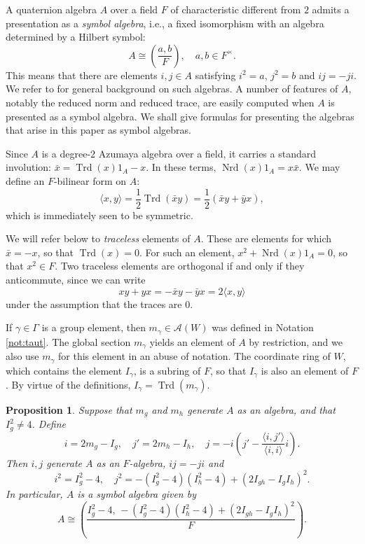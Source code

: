 \documentclass[reqno,oneside,dvipsnames,pdfnames,final]{amsart}
\newtheorem{prop}[thm]{Proposition}
\theoremstyle{definition}
\newcommand{\sh}[1]{\mathcal{#1}}
\newcommand{\iso}{\cong}
\newcommand{\Nrd}{\operatorname{Nrd}}
\newcommand{\Trd}{\operatorname{Trd}}
\begin{document}
A quaternion algebra $A$ over a field $F$ of characteristic different from $2$ admits a presentation as a \emph{symbol algebra}, i.e., a fixed isomorphism with an algebra determined by a Hilbert symbol:
\[ A \iso \left( \frac{a,b}{F} \right ),\quad a,b \in F^\times. \]
This means that there are elements $i, j \in A$ satisfying $i^2=a$, $j^2=b$ and $ij=-ji$. We refer to \cite{Voight2021} for general background on such algebras. A number of features of $A$, notably the reduced norm and reduced trace, are easily computed when $A$ is presented as a symbol algebra. We shall give formulas for presenting the algebras that arise in this paper as symbol algebras.

Since $A$ is a degree-$2$ Azumaya algebra over a field, it carries a standard
involution: $\bar x = \Trd(x)1_A - x$. In these terms, $\Nrd(x)1_A = x \bar x$.
We may define an $F$-bilinear form on $A$:
\[ \langle x, y \rangle = \frac{1}{2}\Trd(\bar x y ) = \frac{1}{2}(\bar x y + \bar y x),\] which is immediately seen to be symmetric.

We will refer below to \emph{traceless} elements of $A$. These are elements for which $\bar x = -x$, so that $\Trd(x) = 0$. For such an element, $x^2 + \Nrd(x)1_A = 0$, so that $x^2 \in F$. Two traceless elements are orthogonal if and only if they anticommute, since we can write
\[ xy + yx = -\bar x y - \bar y x = 2 \langle x, y \rangle \]
under the assumption that the traces are $0$.

If $\gamma \in \Gamma$ is a group element, then $m_\gamma \in \sh A(W)$ was defined in Notation \ref{not:taut}. The global section $m_\gamma$ yields an element of $A$ by restriction, and we also use $m_\gamma$ for this element in an abuse of notation. The coordinate ring of $W$, which contains the element $I_\gamma$, is a subring of $F$, so that $I_\gamma$ is also an element of $F$. By virtue of the definitions, $I_\gamma = \Trd(m_\gamma)$.


\begin{prop} \label{pr:symbolAlgebra}
 Suppose that $m_g$ and $m_h$ generate $A$ as an algebra, and that $I_g^2
  \neq 4$. Define
  \[ i = 2m_g  - I_g, \quad j' = 2m_h - I_h, \quad j= -i\left(j' - \frac{\langle i,j' \rangle}{\langle i , i \rangle }
      i \right).\]
  Then $i,j$ generate $A$ as an $F$-algebra, $ij=-ji$ and
  \[ i^2 = I_g^2 - 4, \quad j^2 = -(I_g^2 -4)(I_h^2-4) + (2I_{gh} - I_gI_h)^2. \]
  In particular, $A$ is a symbol algebra given by
  \[ A \iso \left( \frac{I_g^2 - 4, \, -(I_g^2 -4)(I_h^2-4) + (2I_{gh} - I_gI_h)^2}{F} \right).\]  
\end{prop}
\end{document}
